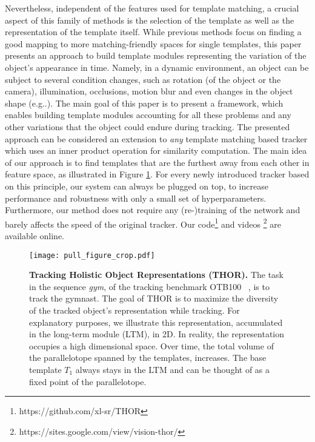 \documentclass{article}
\makeatletter
\DeclareRobustCommand\onedot{\futurelet\@let@token\@onedot}
\def\@onedot{\ifx\@let@token.\else.\null\fi\xspace}
\def\eg{e.g\onedot} \def\Eg{E.g\onedot}
\makeatother
\begin{document}
Nevertheless, independent of the features used for template matching, a crucial aspect of this family of methods is the selection of the template as well as the representation of the template itself. While previous methods focus on finding a good mapping to more matching-friendly spaces for single templates, this paper presents an approach to build template modules representing the variation of the object's appearance in time. Namely, in a dynamic environment, an object can be subject to several condition changes, such as rotation (of the object or the camera), illumination, occlusions, motion blur and even changes in the object shape (\eg{ due to a deformation}). The main goal of this paper is to present a framework, which enables building template modules accounting for all these problems and any other variations that the object could endure during tracking. The presented approach can be considered an extension to \textit{any} template matching based tracker which uses an inner product operation for similarity computation. The main idea of our approach is to find templates that are the furthest away from each other in feature space, as illustrated in Figure \ref{fig:templates}. For every newly introduced tracker based on this principle, our system can always be plugged on top, to increase performance and robustness with only a small set of hyperparameters. Furthermore, our method does not require any (re-)training of the network and barely affects the speed of the original tracker. Our code\footnote{https://github.com/xl-sr/THOR} and videos \footnote{https://sites.google.com/view/vision-thor/} are available online.

\begin{figure}[htb!]
    \centering
    \texttt{[image: pull\_figure\_crop.pdf]}
    \caption{\textbf{Tracking Holistic Object Representations (THOR).} 
    The task in the sequence \textit{gym}, of the tracking benchmark OTB100 ~\cite{OTB2015}, is to track the gymnast. The goal of THOR is to maximize the diversity of the tracked object's representation while tracking. For explanatory purposes, we illustrate this representation, accumulated in the long-term module (LTM), in 2D. In reality, the representation occupies a high dimensional space. Over time, the total volume of the parallelotope spanned by the templates, increases. The base template $T_1$ always stays in the LTM and can be thought of as a fixed point of the parallelotope.}
    \label{fig:templates}
\end{figure}
\end{document}
